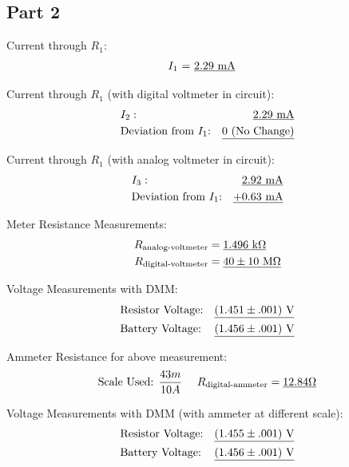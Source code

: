 \documentclass[twocolumn,english]{IEEEtran}
\theoremstyle{plain}
\theoremstyle{plain}
\begin{document}
  \subsection*{\textbf{Part 2}}
  Current through $R_1$:
  \begin{align*}
   &\text{$I_1$ = \underline{$2.29$ mA}}
  \end{align*}

  Current through $R_1$ (with digital voltmeter in circuit):
  \begin{align*}
   &I_2:  &\text{\underline{2.29 mA}} \\
   &\text{Deviation from $I_1$:} &\text{\underline{0 (No Change)}}
  \end{align*}

  Current through $R_1$ (with analog voltmeter in circuit):
  \begin{align*}
   &I_3: &\text{\underline{2.92 mA}} \\
   &\text{Deviation from $I_1$:} &\text{\underline{+0.63 mA}}
  \end{align*}

  Meter Resistance Measurements:
  \begin{align*}
   R_{\text{analog-voltmeter}} 	&=\text{\underline{$1.496 $ k$\Omega$}} \\
   R_{\text{digital-voltmeter}}	&=\text{\underline{$40 \pm 10$ M$\Omega$}}
  \end{align*}

  Voltage Measurements with DMM:
  \begin{align*}
   &\text{Resistor Voltage:} &\text{\underline{$(1.451 \pm .001)$ V}} \\
   &\text{Battery Voltage:}  &\text{\underline{$(1.456 \pm .001)$ V}}
  \end{align*}

  Ammeter Resistance for above measurement:
  \begin{align*}
   &\text{Scale Used: $\frac{43 m}{10 A}$ } &R_\text{digital-ammeter} = \text{\underline{$12.84 \Omega$}} \\
  \end{align*}

  Voltage Measurements with DMM (with ammeter at different scale):
  \begin{align*}
   &\text{Resistor Voltage:} & \text{\underline{$(1.455 \pm .001)$ V}} \\
   &\text{Battery Voltage:}  & \text{\underline{$(1.456 \pm .001)$ V}}
  \end{align*}
\end{document}

